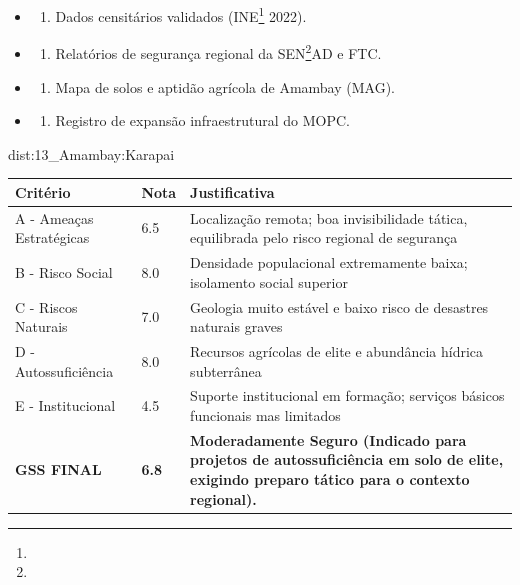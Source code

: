 {\begin{itemize}
\tightlist
\item
  \begin{enumerate}
  \def\labelenumi{\arabic{enumi})}
  \tightlist
  \item
    Dados censitários validados (INE\footnote{\fineINE} 2022).
  \end{enumerate}
\item
  \begin{enumerate}
  \def\labelenumi{\arabic{enumi})}
  \setcounter{enumi}{1}
  \tightlist
  \item
    Relatórios de segurança regional da SEN\footnote{\fineSEN}AD e FTC.
  \end{enumerate}
\item
  \begin{enumerate}
  \def\labelenumi{\arabic{enumi})}
  \setcounter{enumi}{2}
  \tightlist
  \item
    Mapa de solos e aptidão agrícola de Amambay (MAG).
  \end{enumerate}
\item
  \begin{enumerate}
  \def\labelenumi{\arabic{enumi})}
  \setcounter{enumi}{3}
  \tightlist
  \item
    Registro de expansão infraestrutural do MOPC.
  \end{enumerate}
\end{itemize}}{dist:13_Amambay:Karapai}
\begin{table}[ht!]
\small \begin{tabular}{p{3.0cm}p{0.8cm}p{6.0cm}} \toprule
\textbf{Critério} & \textbf{Nota} & \textbf{Justificativa} \\ \midrule
A - Ameaças Estratégicas & 6.5 & Localização remota; boa invisibilidade tática, equilibrada pelo risco regional de segurança \\
B - Risco Social & 8.0 & Densidade populacional extremamente baixa; isolamento social superior \\
C - Riscos Naturais & 7.0 & Geologia muito estável e baixo risco de desastres naturais graves \\
D - Autossuficiência & 8.0 & Recursos agrícolas de elite e abundância hídrica subterrânea \\
E - Institucional & 4.5 & Suporte institucional em formação; serviços básicos funcionais mas limitados \\
\midrule \textbf{GSS FINAL} & \textbf{6.8} & \textbf{Moderadamente Seguro (Indicado para projetos de autossuficiência em solo de elite, exigindo preparo tático para o contexto regional).} \\ \bottomrule \end{tabular}
\end{table}

